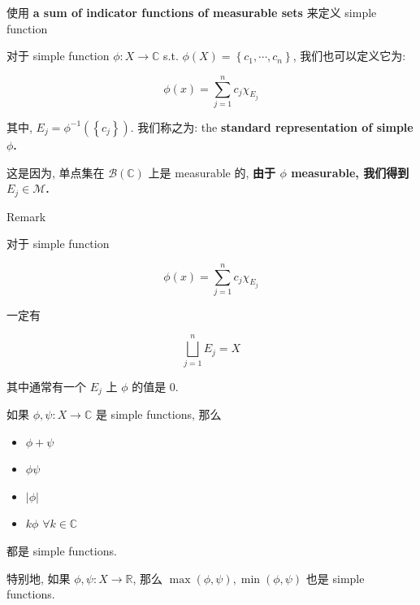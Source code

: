 \documentclass{qlnotes-export}
\begin{document}
\begin{proposition}{使用 \textbf{a sum of indicator functions of measurable sets} 来定义
simple function}\label{prop-04-measurable-functions-and-integration-on-l-mu-a-sum-of-indicator-functions-of-measurable-sets-simple-function}

对于 simple function \(\phi:X\rightarrow{\mathbb{C}}\) s.t. \(\phi(X) = \left\{ {c_{1},\cdots,c_{n}} \right\}\), 我们也可以定义它为:

\[\phi(x) = \sum\limits_{j = 1}^{n}c_{j}\chi_{E_{j}}\]

其中, \(E_{j} = \phi^{- 1}(\left\{ c_{j} \right\})\). 我们称之为: the \textbf{standard representation of simple \(\phi\).}

\end{proposition}

这是因为, 单点集在 \(\mathcal{B}({\mathbb{C}})\) 上是 measurable 的, \textbf{由于 \(\phi\) measurable, 我们得到 \(E_{j} \in \mathcal{M}\).}

\begin{qlremark}{Remark}

对于 simple function

\[\phi(x) = \sum\limits_{j = 1}^{n}c_{j}\chi_{E_{j}}\]

一定有

\[\bigsqcup\limits_{j = 1}^{n}E_{j} = X\]

其中通常有一个 \(E_{j}\) 上 \(\phi\) 的值是 0.

\end{qlremark}

\begin{lemma}\label{lem-04-measurable-functions-and-integration-on-l-mu-lemma-004}

如果 \(\phi,\psi:X\rightarrow{\mathbb{C}}\) 是 simple functions, 那么

\begin{itemize}
\item
  \(\phi + \psi\)
\item
  \(\phi\psi\)
\item
  \(|\phi|\)
\item
  \(k\phi\) \(\forall k \in {\mathbb{C}}\)
\end{itemize}

都是 simple functions.

特别地, 如果 \(\phi,\psi:X\rightarrow{\mathbb{R}}\), 那么 \(\max(\phi,\psi),\min(\phi,\psi)\) 也是 simple functions.

\end{lemma}
\end{document}
